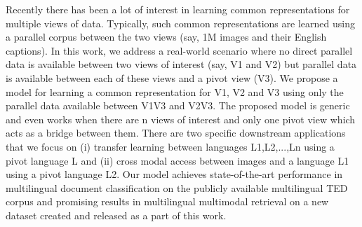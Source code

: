 Recently there has been a lot of interest in learning common representations for multiple views of data. Typically, such common representations are learned using a parallel corpus between the two views (say, 1M images and their English captions). In this work, we address a real-world scenario where no direct parallel data is available between two views of interest (say, V1 and V2) but parallel data is available between each of these views and a pivot view (V3). We propose a model for learning a common representation for  V1, V2 and V3 using only the parallel data available between V1V3 and V2V3. The proposed model is generic and even works when there are n views of interest and only one pivot view which acts as a bridge between them. There are two specific downstream applications that we focus on (i) transfer learning between languages L1,L2,...,Ln using a pivot language L and (ii) cross modal access between images and a language L1 using a pivot language L2. Our model achieves state-of-the-art performance in multilingual document classification on the publicly available multilingual TED corpus and promising results in multilingual multimodal retrieval on a new dataset created and released as a part of this work.
